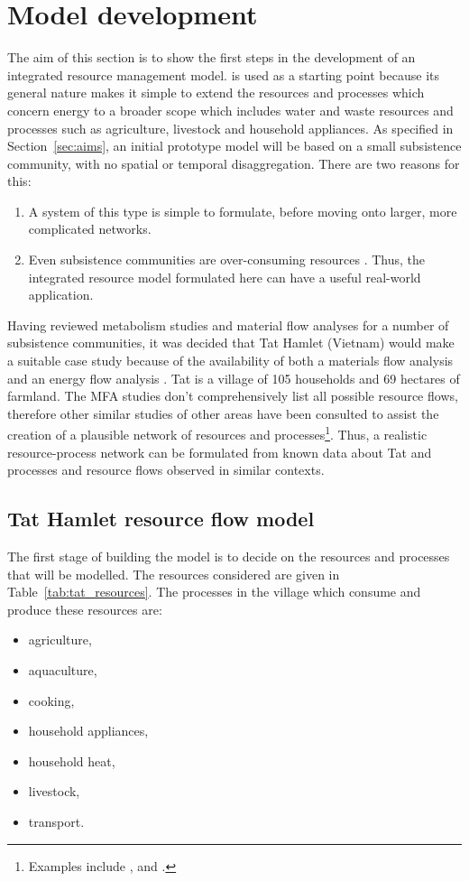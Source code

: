 \section{Model development} \label{sec:models}
The aim of this section is to show the first steps in the development of an integrated resource management model. \citet{Samsatli} is used as a starting point because its general nature makes it simple to extend the resources and processes which concern energy to a broader scope which includes water and waste resources and processes such as agriculture, livestock and household appliances. As specified in Section~\ref{sec:aims}, an initial prototype model will be based on a small subsistence community, with no spatial or temporal disaggregation. There are two reasons for this: 
\begin{enumerate}
	\item A system of this type is simple to formulate, before moving onto larger, more complicated networks.
	\item Even subsistence communities are over-consuming resources \citep{Hobbes2005, Hobbes2007, Schandl2006, Haberl2001b}. Thus, the integrated resource model formulated here can have a useful real-world application.
\end{enumerate}

Having reviewed metabolism studies and material flow analyses for a number of subsistence communities, it was decided that Tat Hamlet (Vietnam) would make a suitable case study because of the availability of both a materials flow analysis \citep{Hobbes2007, Schandl2006} and an energy flow analysis \citep{Heezen2004}. Tat is a village of 105 households and 69 hectares of farmland. The MFA studies don't comprehensively list all possible resource flows, therefore other similar studies of other areas have been consulted to assist the creation of a plausible network of resources and processes\footnote{Examples include \citet{Alam1997}, \citet{Alam1999} and \citet{Tripathi2001}.}. Thus, a realistic resource-process network can be formulated from known data about Tat and processes and resource flows observed in similar contexts. 

\subsection{Tat Hamlet resource flow model}
The first stage of building the model is to decide on the resources and processes that will be modelled. The resources considered are given in Table~\ref{tab:tat_resources}. The processes in the village which consume and produce these resources are:
\begin{itemize}
	\item agriculture,
	\item aquaculture,
	\item cooking,
	\item household appliances,
	\item household heat,
	\item livestock,
	\item transport.
\end{itemize}

